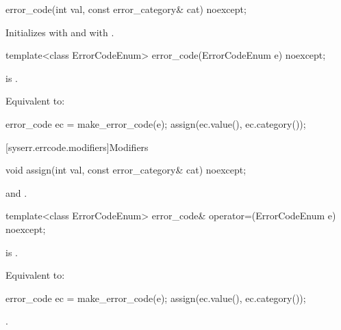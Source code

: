 %
\begin{itemdecl}
error_code(int val, const error_category& cat) noexcept;
\end{itemdecl}

\begin{itemdescr}
\pnum
\effects
Initializes  with 
and  with .
\end{itemdescr}

%
\begin{itemdecl}
template<class ErrorCodeEnum>
  error_code(ErrorCodeEnum e) noexcept;
\end{itemdecl}

\begin{itemdescr}
\pnum
\constraints
{} is .

\pnum
\effects
Equivalent to:
\begin{codeblock}
error_code ec = make_error_code(e);
assign(ec.value(), ec.category());
\end{codeblock}
\end{itemdescr}

[syserr.errcode.modifiers]{Modifiers}

%
\begin{itemdecl}
void assign(int val, const error_category& cat) noexcept;
\end{itemdecl}

\begin{itemdescr}
\pnum
\ensures
{} and .
\end{itemdescr}

%
\begin{itemdecl}
template<class ErrorCodeEnum>
  error_code& operator=(ErrorCodeEnum e) noexcept;
\end{itemdecl}

\begin{itemdescr}
\pnum
\constraints
{} is .

\pnum
\effects
Equivalent to:
\begin{codeblock}
error_code ec = make_error_code(e);
assign(ec.value(), ec.category());
\end{codeblock}

\pnum
\returns
{}.
\end{itemdescr}

